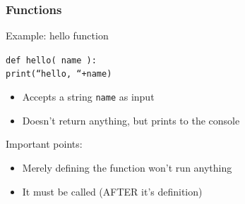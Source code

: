 \documentclass{beamer}
\newcommand{\code}[1]{\texttt{#1}}
\newcommand{\tab}{\hspace*{22pt}}
\begin{document}
\begin{frame}%
	\frametitle{Functions}
	
	\begin{block}{Example: hello function}
			
			
			\code{def hello( name ):\\
			\tab print(``hello, ``+name)
			}
			
			
		\endminipage\hfill
			\begin{itemize}
				\item Accepts a string \code{name} as input
				\item Doesn't return anything, but prints to the console
			\end{itemize}
		\endminipage\hfill
		
		\vspace{15pt}
		
		Important points:
		\begin{itemize}
			\item Merely defining the function won't run anything
			\item It must be called (AFTER it's definition)
		\end{itemize}
	\end{block}
	
\end{frame}
\end{document}
